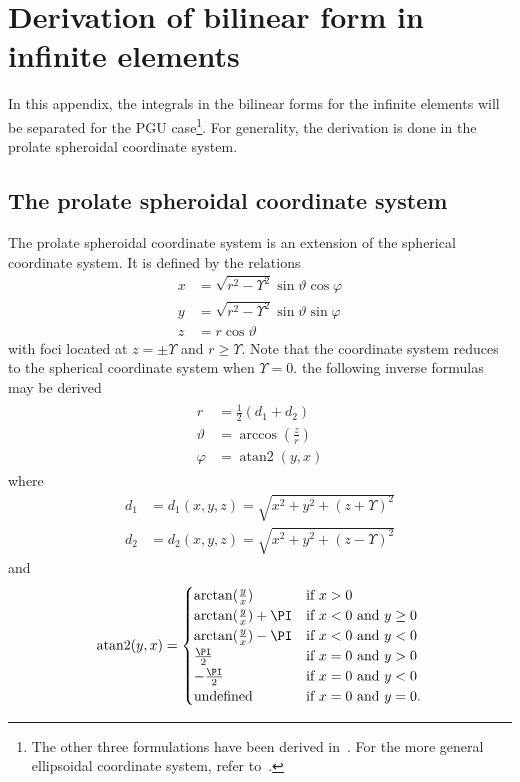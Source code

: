 \newpage
\section{Derivation of bilinear form in infinite elements}
\label{Sec2:AppendixDerivationOfBilinearForm}
In this appendix, the integrals in the bilinear forms for the infinite elements will be separated for the PGU case\footnote{The other three formulations have been derived in~\cite{Venas2015iao}. For the more general ellipsoidal coordinate system, refer to~\cite{Burnett1998aea}.}. For generality, the derivation is done in the prolate spheroidal coordinate system.

\subsection{The prolate spheroidal coordinate system}
\label{Sec2:prolateSphericalCoordinateSystem}
The prolate spheroidal coordinate system is an extension of the spherical coordinate system. It is defined by the relations
\begin{align}
	x &= \sqrt{r^2 - \Upsilon^2}\sin\vartheta\cos\varphi\\
	y &= \sqrt{r^2 - \Upsilon^2}\sin\vartheta\sin\varphi\\
	z &= r\cos\vartheta
\end{align}
with foci located at $z = \pm \Upsilon$ and $r\geq \Upsilon$. Note that the coordinate system reduces to the spherical coordinate system when $\Upsilon=0$. the following inverse formulas may be derived
\begin{align}\label{Eq2:XtoProl}
\begin{split}
	r &= \frac{1}{2}(d_1+d_2)\\
	\vartheta &= \arccos\left(\frac{z}{r}\right)\\
	\varphi &= \operatorname{atan2}(y,x)
\end{split}
\end{align}
where 
\begin{align*}
	d_1 &= d_1(x,y,z) = \sqrt{x^2+y^2+(z+\Upsilon)^2}\\
	d_2 &= d_2(x,y,z) = \sqrt{x^2+y^2+(z-\Upsilon)^2}
\end{align*}
and 
\begin{equation*}
	\operatorname{atan2}(y,x) = \begin{cases}
	\arctan(\frac{y}{x}) & \mbox{if } x > 0\\
	\arctan(\frac{y}{x}) + \PI & \mbox{if } x < 0 \mbox{ and } y \ge 0\\
	\arctan(\frac{y}{x}) - \PI & \mbox{if } x < 0 \mbox{ and } y < 0\\
	\frac{\PI}{2} & \mbox{if } x = 0 \mbox{ and } y > 0\\
	-\frac{\PI}{2} & \mbox{if } x = 0 \mbox{ and } y < 0\\
	\text{undefined} & \mbox{if } x = 0 \mbox{ and } y = 0.
	\end{cases}
\end{equation*}
